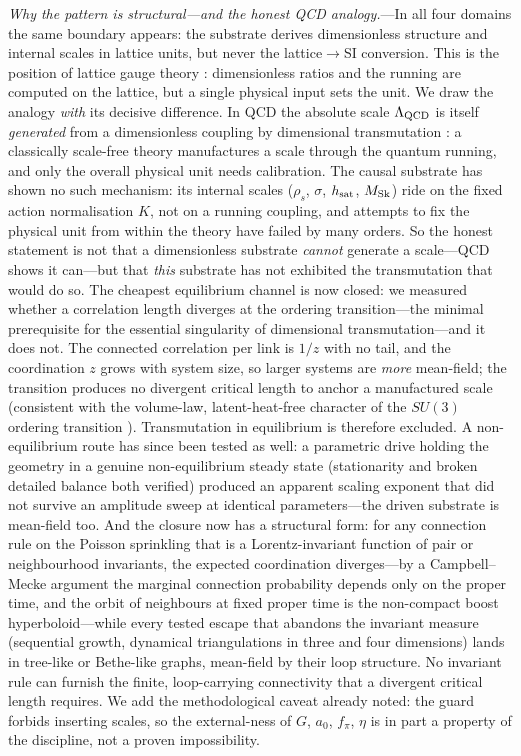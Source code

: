 \documentclass[aps,prl,reprint,nofootinbib,superscriptaddress,floatfix]{revtex4-2}
\begin{document}
\emph{Why the pattern is structural---and the honest QCD analogy.}---In all four domains
the same boundary appears: the substrate derives dimensionless structure and internal
scales in lattice units, but never the lattice$\to$SI conversion. This is the position of
lattice gauge theory \cite{Wilson1974,Creutz1980}: dimensionless ratios and the running
are computed on the lattice, but a single physical input sets the unit. We draw the analogy
\emph{with} its decisive difference. In QCD the absolute scale $\Lambda_{\rm QCD}$ is
itself \emph{generated} from a dimensionless coupling by dimensional transmutation
\cite{GrossWilczek1973,Politzer1973,ColemanWeinberg1973}: a classically scale-free theory
manufactures a scale through the quantum running, and only the overall physical unit needs
calibration. The causal substrate has shown no such mechanism: its internal scales
($\rho_s$, $\sigma$, $h_{\rm sat}$, $M_{\rm Sk}$) ride on the fixed action normalisation
$K$, not on a running coupling, and attempts to fix the physical unit from within the
theory have failed by many orders. So the honest statement is not that a dimensionless
substrate \emph{cannot} generate a scale---QCD shows it can---but that \emph{this}
substrate has not exhibited the transmutation that would do so. The cheapest equilibrium
channel is now closed: we measured whether a correlation length diverges at the ordering
transition---the minimal prerequisite for the essential singularity of dimensional
transmutation---and it does not. The connected correlation per link is $1/z$ with no tail,
and the coordination $z$ grows with system size, so larger systems are \emph{more}
mean-field; the transition produces no divergent critical length to anchor a manufactured
scale (consistent with the volume-law, latent-heat-free character of the $SU(3)$ ordering
transition \cite{SU3PRD}). Transmutation in equilibrium is therefore excluded. A
non-equilibrium route has since been tested as well: a parametric drive holding the
geometry in a genuine non-equilibrium steady state (stationarity and broken detailed
balance both verified) produced an apparent scaling exponent that did not survive an
amplitude sweep at identical parameters---the driven substrate is mean-field too. And the
closure now has a structural form: for any connection rule on the Poisson sprinkling that
is a Lorentz-invariant function of pair or neighbourhood invariants, the expected
coordination diverges---by a Campbell--Mecke argument the marginal connection probability
depends only on the proper time, and the orbit of neighbours at fixed proper time is the
non-compact boost hyperboloid---while every tested escape that abandons the invariant
measure (sequential growth, dynamical triangulations in three and four dimensions) lands
in tree-like or Bethe-like graphs, mean-field by their loop structure. No invariant rule
can furnish the finite, loop-carrying connectivity that a divergent critical length
requires. We
add the methodological caveat already noted: the guard forbids inserting scales, so the
external-ness of $G$, $a_0$, $f_\pi$, $\eta$ is in part a property of the discipline, not a
proven impossibility.
\end{document}
